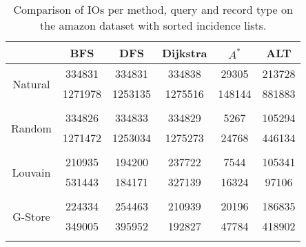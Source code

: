 \begin{table}
	\begin{center}
		 \begin{tabular}[c]{c c c c c c} \toprule
			  & BFS & DFS & Dijkstra & $A^*$  & ALT \\ \midrule 
 			\multirow{2}{*}{Natural}  & 334831 & 334831 & 334838 & 29305 & 213728 \\ 
 				 & 1271978 & 1253135 & 1275516 & 148144 & 881883 \\ 
 				&&&&& \\[-0.5em]
 			\multirow{2}{*}{Random}  & 334826 & 334833 & 334829 & 5267 & 105294 \\ 
 				 & 1271472 & 1253034 & 1275273 & 24768 & 446134 \\ 
 				&&&&& \\[-0.5em]
 			\multirow{2}{*}{Louvain}  & 210935 & 194200 & 237722 & 7544 & 105341 \\ 
 				 & 531443 & 184171 & 327139 & 16324 & 97106 \\ 
 				&&&&& \\[-0.5em]
 			\multirow{2}{*}{G-Store}  & 224334 & 254463 & 210939 & 20196 & 186835 \\ 
 				 & 349005 & 395952 & 192827 & 47784 & 418902 \\ 
 				&&&&& \\[-0.5em]
 					\end{tabular}  
  	 \end{center}
	 \caption{Comparison of IOs per method, query and record type on the amazon dataset with sorted incidence lists.}
	 \label{amazon-s}
\end{table}
